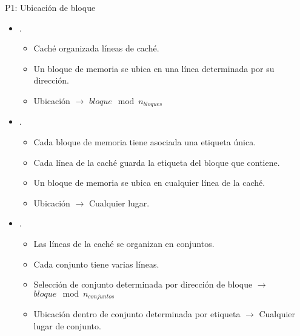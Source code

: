 \begin{frame}[t,shrink=10]{P1: Ubicación de bloque}
\begin{itemize}
  \item {}.
    \begin{itemize}
      \item Caché organizada líneas de caché.
      \item Un bloque de memoria se ubica en una línea determinada por su dirección.
      \item Ubicación $\rightarrow$ $bloque \mod n_{bloques}$
    \end{itemize}

  \item {}.
    \begin{itemize}
      \item Cada bloque de memoria tiene asociada una etiqueta única.
      \item Cada línea de la caché guarda la etiqueta del bloque que contiene.
      \item Un bloque de memoria se ubica en cualquier línea de la caché.
      \item Ubicación $\rightarrow$ Cualquier lugar.
    \end{itemize}

  \item {}.
    \begin{itemize}
      \item Las líneas de la caché se organizan en conjuntos.
      \item Cada conjunto tiene varias líneas.
      \item Selección de conjunto determinada por dirección de bloque 
            $\rightarrow$ $bloque \mod n_{conjuntos}$
      \item Ubicación dentro de conjunto determinada por etiqueta
            $\rightarrow$ Cualquier lugar de conjunto.
    \end{itemize}
\end{itemize}
\end{frame}

